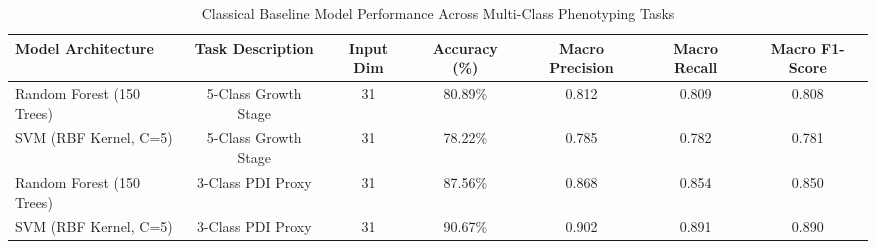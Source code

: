 \documentclass{ieeeaccess}
\begin{document}
\begin{table}[t]
\caption{Classical Baseline Model Performance Across Multi-Class Phenotyping Tasks}
\label{tab:classical_multiclass}
\centering
\begin{tabular*}{\textwidth}{@{\extracolsep{\fill}}lcccccc@{}}
\toprule
\textbf{Model Architecture} & \textbf{Task Description} & \textbf{Input Dim} & \textbf{Accuracy (\%)} & \textbf{Macro Precision} & \textbf{Macro Recall} & \textbf{Macro F1-Score} \\
\midrule
Random Forest (150 Trees)   & 5-Class Growth Stage      & 31                 & 80.89\%                & 0.812                    & 0.809                 & 0.808                   \\
SVM (RBF Kernel, C=5)       & 5-Class Growth Stage      & 31                 & 78.22\%                & 0.785                    & 0.782                 & 0.781                   \\
Random Forest (150 Trees)   & 3-Class PDI Proxy         & 31                 & 87.56\%                & 0.868                    & 0.854                 & 0.850                   \\
SVM (RBF Kernel, C=5)       & 3-Class PDI Proxy         & 31                 & 90.67\%                & 0.902                    & 0.891                 & 0.890                   \\
\bottomrule
\end{tabular*}
\end{table}
\end{document}
